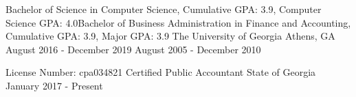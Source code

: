 
\begin{cventries}
  \cventry
    {Bachelor of Science in Computer Science, Cumulative GPA: 3.9, Computer Science GPA: 4.0\newline Bachelor of Business Administration in Finance and Accounting, Cumulative GPA: 3.9, Major GPA: 3.9} %
    {The University of Georgia} %
    {Athens, GA} %
    {August 2016 - December 2019 \newline August 2005 - December 2010} %
    {
      \begin{cvitems} %
      \end{cvitems}
    }
    
    \vspace{-3.5mm}
    
    
    
   \cventry
    {License Number: cpa034821} %
    {Certified Public Accountant} %
    {State of Georgia} %
    {January 2017 - Present} %
    {
      \begin{cvitems} 
      \end{cvitems}
    }
    
\end{cventries}

